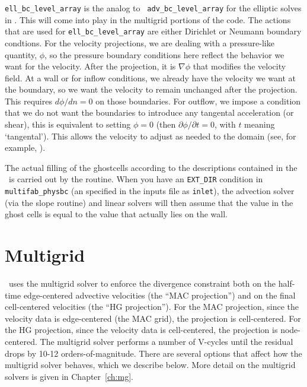 {\tt ell\_bc\_level\_array} is the analog to {\tt
  adv\_bc\_level\_array} for the elliptic solves in \maestro.  This
will come into play in the multigrid portions of the code.  The
actions that are used for {\tt ell\_bc\_level\_array} are either
Dirichlet or Neumann boundary condtions.  For the velocity
projections, we are dealing with a pressure-like quantity, $\phi$, so
the pressure boundary conditions here reflect the behavior we want for
the velocity.  After the projection, it is $\nabla \phi$ that modifies
the velocity field.  At a wall or for inflow conditions, we already
have the velocity we want at the boundary, so we want the velocity to
remain unchanged after the projection.  This requires $d\phi/dn=0$ on
those boundaries.  For outflow, we impose a condition that we do not
want the boundaries to introduce any tangental acceleration (or
shear), this is equivalent to setting $\phi = 0$ (then $\partial
\phi/\partial t = 0$, with $t$ meaning `tangental').  This allows the
velocity to adjust as needed to the domain (see, for example,
\cite{almgrenBellSzymczak:1996}).

The actual filling of the ghostcells according to the descriptions
contained in the \bctower\ is carried out by the  routine.  When you have an {\tt EXT\_DIR}
condition in {\tt multifab\_physbc} (an specified in the inputs file
as {\tt inlet}), the advection solver (via the slope routine) and
linear solvers will then assume that the value in the ghost cells is
equal to the value that actually lies on the wall.






\section{Multigrid}

\maestro\ uses the multigrid solver to enforce the divergence
constraint both on the half-time edge-centered advective velocities
(the ``MAC projection'') and on the final cell-centered velocities
(the ``HG projection'').  For the MAC projection, since the velocity
data is edge-centered (the MAC grid), the projection is cell-centered.
For the HG projection, since the velocity data is cell-centered, the
projection is node-centered.   The
multigrid solver performs a number of V-cycles until the residual
drops by 10-12 orders-of-magnitude.  There are several options that
affect how the multigrid solver behaves, which we describe below.
More detail on the multigrid solvers is given in Chapter~\ref{ch:mg}.


